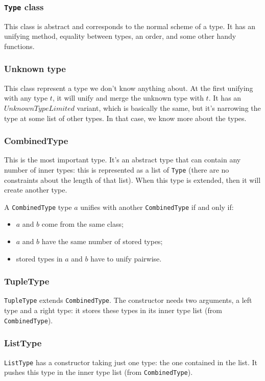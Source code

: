 \documentclass{article}
\newcommand\cc[1]{\lstinline{#1}}
\begin{document}
			\subsubsection{\texttt{Type} class}
				This class is abstract and corresponds to the normal scheme of a type. It has an unifying method, equality between types, an order, and some other handy functions.
			\subsubsection{Unknown type}
				This class represent a type we don't know anything about. At the first unifying with any type $t$, it will unify and merge the unknown type with $t$.
				It has an $UnknownTypeLimited$ variant, which is basically the same, but it's narrowing the type at some list of other types. In that case, we know more about the types.
			\subsubsection{CombinedType}
				This is the most important type. It's an abstract type that can contain any number of inner types: this is represented as a list of \cc{Type} (there are no constraints about the length of that list). When this type is extended, then it will create another type.

				A \cc{CombinedType} type $a$ unifies with another \cc{CombinedType} if and only if:
				\begin{itemize}
					\item $a$ and $b$ come from the same class;
					\item $a$ and $b$ have the same number of stored types;
					\item stored types in $a$ and $b$ have to unify pairwise. 
				\end{itemize}
			\subsubsection{TupleType}
				\cc{TupleType} extends \cc{CombinedType}. The constructor needs two arguments, a left type and a right type: it stores these types in its inner type list (from \cc{CombinedType}).
			\subsubsection{ListType}
				\cc{ListType} has a constructor taking just one type: the one contained in the list. It pushes this type in the inner type list (from \cc{CombinedType}).
\end{document}
